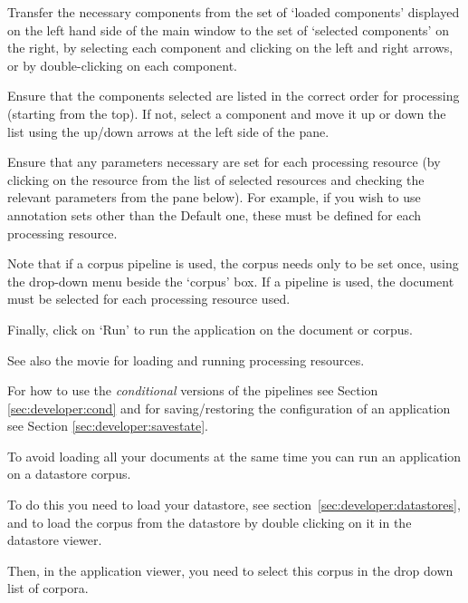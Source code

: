 Transfer the necessary components from the set of `loaded components'
displayed on the left hand side of the main window to the set of `selected
components' on the right, by selecting each component and clicking on the
left and right arrows, or by double-clicking on each component.

Ensure that the components selected are listed in the correct order for
processing (starting from the top). If not, select a component and move it
up or down the list using the up/down arrows at the left side of the
pane.

Ensure that any parameters necessary are set for each processing resource
(by clicking on the resource from the list of selected resources and
checking the relevant parameters from the pane below). For example, if you
wish to use annotation sets other than the Default one, these must be
defined for each processing resource.

Note that if a corpus pipeline is used, the corpus needs only to be set
once, using the drop-down menu beside the `corpus' box. If a pipeline is
used, the document must be selected for each processing resource
used.

Finally, click on `Run' to run the application on the document or corpus.

See also the 
{movie for loading and running processing resources}.

For how to use the \emph{conditional} versions of the pipelines see Section
\ref{sec:developer:cond} and for saving/restoring the configuration of an
application see Section \ref{sec:developer:savestate}.



To avoid loading all your documents at the same time you can run an
application on a datastore corpus.

To do this you need to load your datastore, see
section~\ref{sec:developer:datastores}, and to load the corpus from the
datastore by double clicking on it in the datastore viewer.

Then, in the application viewer, you need to select this corpus in the drop
down list of corpora.

